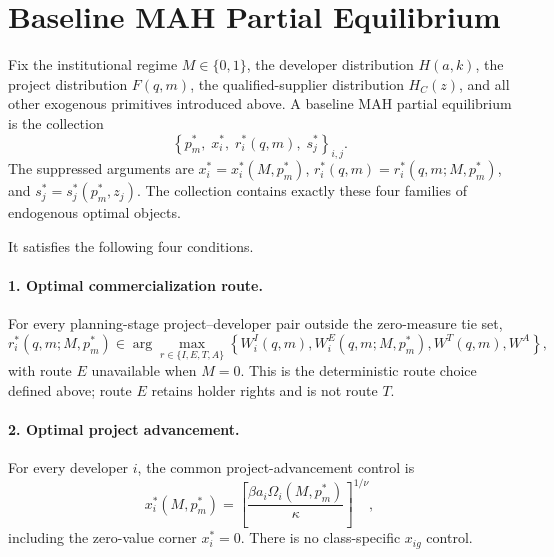 \section{Baseline MAH Partial Equilibrium}
\label{sec:p07-equilibrium}

Fix the institutional regime \(M\in\{0,1\}\), the developer distribution
\(H(a,k)\), the project distribution \(F(q,m)\), the qualified-supplier
distribution \(H_C(z)\), and all other exogenous primitives introduced above.
A baseline MAH partial equilibrium is the collection
\begin{equation}
  \boxed{
  \left\{
    p_m^*,\;
    x_i^*,\;
    r_i^*(q,m),\;
    s_j^*
  \right\}_{i,j}}
  .
  \label{eq:p07-equilibrium-collection}
\end{equation}
The suppressed arguments are \(x_i^*=x_i^*(M,p_m^*)\),
\(r_i^*(q,m)=r_i^*(q,m;M,p_m^*)\), and
\(s_j^*=s_j^*(p_m^*,z_j)\). The collection contains exactly these four
families of endogenous optimal objects.

It satisfies the following four conditions.

\paragraph{1. Optimal commercialization route.}
For every planning-stage project--developer pair outside the zero-measure tie
set,
\begin{equation}
  r_i^*(q,m;M,p_m^*)
  \in
  \arg\max_{r\in\{I,E,T,A\}}
  \left\{
    W_i^I(q,m),
    W_i^E(q,m;M,p_m^*),
    W^T(q,m),
    W^A
  \right\},
  \label{eq:p07-route-optimality}
\end{equation}
with route \(E\) unavailable when \(M=0\). This is the deterministic route
choice defined above; route \(E\) retains holder rights and is not route \(T\).

\paragraph{2. Optimal project advancement.}
For every developer \(i\), the common project-advancement control is
\begin{equation}
  x_i^*(M,p_m^*)
  =
  \left[
    \frac{\beta a_i\Omega_i(M,p_m^*)}{\kappa}
  \right]^{1/\nu},
  \label{eq:p07-advancement-optimality}
\end{equation}
including the zero-value corner \(x_i^*=0\). There is no class-specific
\(x_{ig}\) control.

